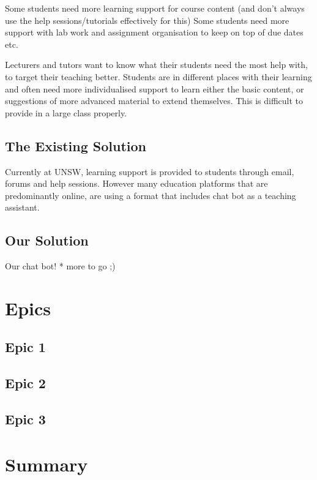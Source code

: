 \documentclass{article}
\begin{document}
Some students need more learning support for course content (and don't always use the help sessions/tutorials effectively for this)
Some students need more support with lab work and assignment organisation to keep on top of due dates etc. 

Lecturers and tutors want to know what their students need the most help with, to target their teaching better. Students are in different 
places with their learning and often need more individualised support to learn either the basic content, or suggestions of more advanced 
material to extend themselves. This is difficult to provide in a large class properly.




\subsection{The Existing Solution}
Currently at UNSW, learning support is provided to students through email, forums and help sessions. However many education
platforms that are predominantly online, are using a format that includes chat bot as a teaching assistant.

\subsection{Our Solution}
Our chat bot! * more to go ;) 

\section{Epics}
\subsection{Epic 1}


\subsection{Epic 2}


\subsection{Epic 3}


\section{Summary}
\end{document}
